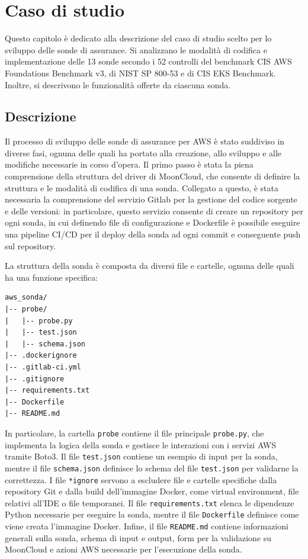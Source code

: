 \chapter{Caso di studio}
\label{cap:caso_studio}

Questo capitolo è dedicato alla descrizione del caso di studio scelto per lo sviluppo delle sonde di assurance. Si analizzano le modalità di codifica e implementazione delle 13 sonde secondo i 52 controlli del benchmark CIS AWS Foundations Benchmark v3, di NIST SP 800-53 e di CIS EKS Benchmark. Inoltre, si descrivono le funzionalità offerte da ciascuna sonda.

\section{Descrizione}
\label{sec:descrizione}

Il processo di sviluppo delle sonde di assurance per AWS è stato suddiviso in diverse fasi, ognuna delle quali ha portato alla creazione, allo sviluppo e alle modifiche necessarie in corso d'opera. Il primo passo è stata la piena comprensione della struttura del driver di MoonCloud, che consente di definire la struttura e le modalità di codifica di una sonda. Collegato a questo, è stata necessaria la comprensione del servizio Gitlab per la gestione del codice sorgente e delle versioni: in particolare, questo servizio consente di creare un repository per ogni sonda, in cui definendo file di configurazione e Dockerfile è possibile eseguire una pipeline CI/CD per il deploy della sonda ad ogni commit e conseguente push sul repository.

La struttura della sonda è composta da diversi file e cartelle, ognuna delle quali ha una funzione specifica:

\begin{lstlisting}[caption={Struttura di ogni sonda per MoonCloud}]
aws_sonda/
|-- probe/
|   |-- probe.py
|   |-- test.json
|   |-- schema.json
|-- .dockerignore
|-- .gitlab-ci.yml
|-- .gitignore  
|-- requirements.txt
|-- Dockerfile
|-- README.md
\end{lstlisting}

In particolare, la cartella \texttt{probe} contiene il file principale \texttt{probe.py}, che implementa la logica della sonda e gestisce le interazioni con i servizi AWS tramite Boto3. Il file \texttt{test.json} contiene un esempio di input per la sonda, mentre il file \texttt{schema.json} definisce lo schema del file \texttt{test.json} per validarne la correttezza. I file \texttt{*ignore} servono a escludere file e cartelle specifiche dalla repository Git e dalla build dell'immagine Docker, come virtual environment, file relativi all'IDE o file temporanei. Il file \texttt{requirements.txt} elenca le dipendenze Python necessarie per eseguire la sonda, mentre il file \texttt{Dockerfile} definisce come viene creata l'immagine Docker. Infine, il file \texttt{README.md} contiene informazioni generali sulla sonda, schema di input e output, form per la validazione su MoonCloud e azioni AWS necessarie per l'esecuzione della sonda.

